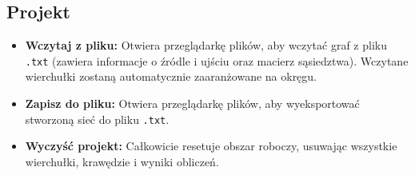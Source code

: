 \documentclass{article}
\begin{document}
	\subsection*{Projekt}
	\begin{itemize}
		\item \textbf{Wczytaj z pliku:} Otwiera przeglądarkę plików, aby wczytać graf z pliku \texttt{.txt} (zawiera informacje o źródle i ujściu oraz macierz sąsiedztwa). Wczytane wierchułki zostaną automatycznie zaaranżowane na okręgu.
		\item \textbf{Zapisz do pliku:} Otwiera przeglądarkę plików, aby wyeksportować stworzoną sieć do pliku \texttt{.txt}.
		\item \textbf{Wyczyść projekt:} Całkowicie resetuje obszar roboczy, usuwając wszystkie wierchułki, krawędzie i wyniki obliczeń.
	\end{itemize}
	
\end{document}
